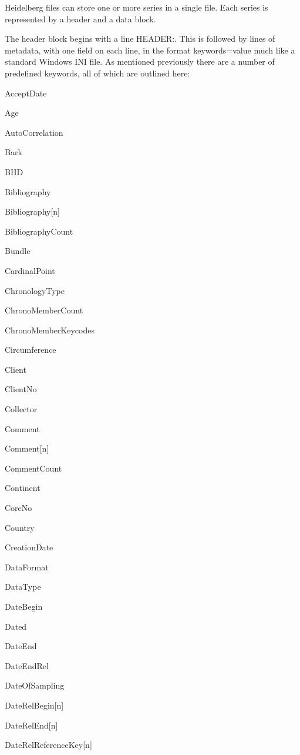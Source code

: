 Heidelberg files can store one or more series in a single file. Each series is represented by a header and a data block.

The header block begins with a line HEADER:. This is followed by lines of metadata, with one field on each line, in the format keywords=value much like a standard Windows INI file. As mentioned previously there are a number of predefined keywords, all of which are outlined here:

\begin{multicols}{2}
\begin{itemize*}
 \item  AcceptDate
 \item  Age
 \item  AutoCorrelation
 \item  Bark
 \item  BHD
 \item  Bibliography
 \item  Bibliography[n]
 \item  BibliographyCount
 \item  Bundle
 \item  CardinalPoint
 \item  ChronologyType
 \item  ChronoMemberCount
 \item  ChronoMemberKeycodes
 \item  Circumference
 \item  Client
 \item  ClientNo
 \item  Collector
 \item  Comment
 \item  Comment[n]
 \item  CommentCount
 \item  Continent
 \item  CoreNo
 \item  Country
 \item  CreationDate
 \item  DataFormat
 \item  DataType
 \item  DateBegin
 \item  Dated
 \item  DateEnd
 \item  DateEndRel
 \item  DateOfSampling
 \item  DateRelBegin[n]
 \item  DateRelEnd[n]
 \item  DateRelReferenceKey[n]

\end{itemize*}
\end{multicols}
